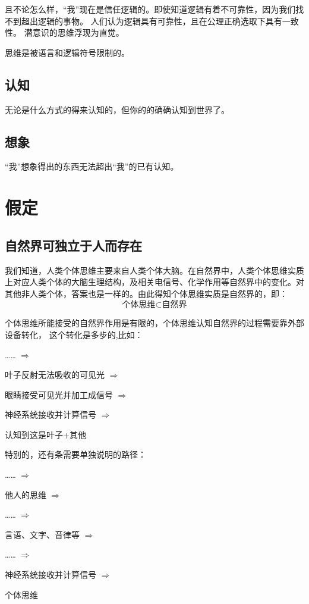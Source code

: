 \documentclass[fontset=windows, 12pt, a4paper]{article}
\begin{document}
且不论怎么样，“我”现在是信任逻辑的。即使知道逻辑有着不可靠性，因为我们找不到超出逻辑的事物。
人们认为逻辑具有可靠性，且在公理正确选取下具有一致性。
潜意识的思维浮现为直觉。

思维是被语言和逻辑符号限制的。

\subsection{认知}
无论是什么方式的得来认知的，但你的的确确认知到世界了。

\subsection{想象}
“我”想象得出的东西无法超出“我”的已有认知。

\section{假定}
\subsection{自然界可独立于人而存在}

我们知道，人类个体思维主要来自人类个体大脑。在自然界中，人类个体思维实质上对应人类个体的大脑生理结构，及相关电信号、化学作用等自然界中的变化。对其他非人类个体，答案也是一样的。由此得知个体思维实质是自然界的，即：
$$\pmb{\mbox{个体思维} \subset \mbox{自然界}}$$

个体思维所能接受的自然界作用是有限的，个体思维认知自然界的过程需要靠外部设备转化，
这个转化是多步的,比如：\par
\begin{center}
    ……
    $\Rightarrow$\par
    叶子反射无法吸收的可见光
    $\Rightarrow$\par
    眼睛接受可见光并加工成信号
    $\Rightarrow$\par
    神经系统接收并计算信号
    $\Rightarrow$\par
    认知到这是叶子+其他
\end{center}
特别的，还有条需要单独说明的路径：\par
\begin{center}
    ……
    $\Rightarrow$\par
    他人的思维
    $\Rightarrow$\par
    ……
    $\Rightarrow$\par
    言语、文字、音律等
    $\Rightarrow$\par
    ……
    $\Rightarrow$\par
    神经系统接收并计算信号
    $\Rightarrow$\par
    个体思维
\end{center}
\end{document}
